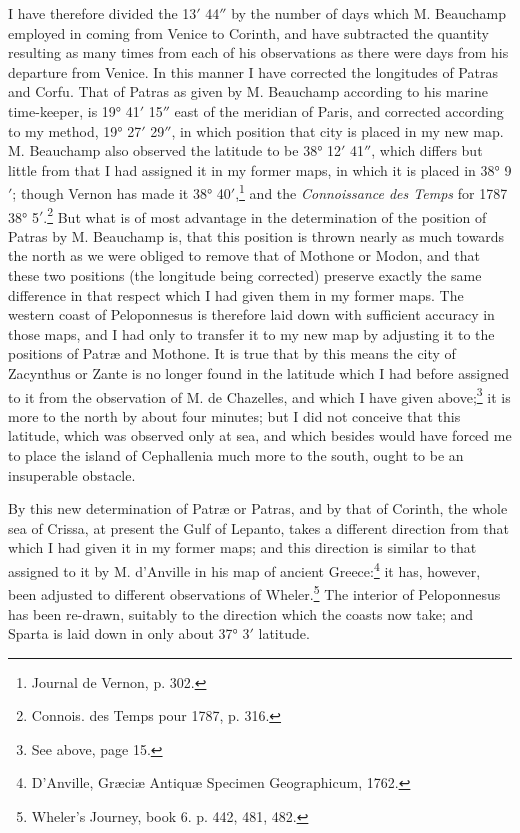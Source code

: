 \documentclass[a4paper, 11pt, oneside, polutonikogreek, english]{article}
\begin{document}
I have therefore divided the 13$'$ 44$''$ by the number of days which M. Beauchamp employed in coming from Venice to Corinth, and have subtracted the quantity resulting as many times from each of his observations as there were days from his departure from Venice. In this manner I have corrected the longitudes of Patras and Corfu. That of Patras as given by M. Beauchamp according to his marine time-keeper, is 19° 41$'$ 15$''$ east of the meridian of Paris, and corrected according to my method, 19° 27$'$ 29$''$, in which position that city is placed in my new map. M. Beauchamp also observed the latitude to be 38° 12$'$ 41$''$, which differs but little from that I had assigned it in my former maps, in which it is placed in 38° 9$'$; though Vernon has made it 38° 40$'$,\footnote{Journal de Vernon, p. 302.} and the \emph{Connoissance des Temps} for 1787 38° 5$'$.\footnote{Connois. des Temps pour 1787, p. 316.} But what is of most advantage in the determination of the position of Patras by M. Beauchamp is, that this position is thrown nearly as much towards the north as we were obliged to remove that of Mothone or Modon, and that these two positions (the longitude being corrected) preserve exactly the same difference in that respect which I had given them in my former maps. The western coast of Peloponnesus is therefore laid down with sufficient accuracy in those maps, and I had only to transfer it to my new map by adjusting it to the positions of Patræ and Mothone. It is true that by this means the city of Zacynthus or Zante is no longer found in the latitude which I had before assigned to it from the observation of M. de Chazelles, and which I have given above;\footnote{See above, page 15.} it is more to the north by about four minutes; but I did not conceive that this latitude, which was observed only at sea, and which besides would have forced me to place the island of Cephallenia much more to the south, ought to be an insuperable obstacle.

By this new determination of Patræ or Patras, and by that of Corinth, the whole sea of Crissa, at present the Gulf of Lepanto, takes a different direction from that which I had given it in my former maps; and this direction is similar to that assigned to it by M. d'Anville in his map of ancient Greece:\footnote{D'Anville, Græciæ Antiquæ Specimen Geographicum, 1762.} it has, however, been adjusted to different observations of Wheler.\footnote{Wheler's Journey, book 6. p. 442, 481, 482.} The interior of Peloponnesus has been re-drawn, suitably to the direction which the coasts now take; and Sparta is laid down in only about 37° 3$'$ latitude.
\end{document}
